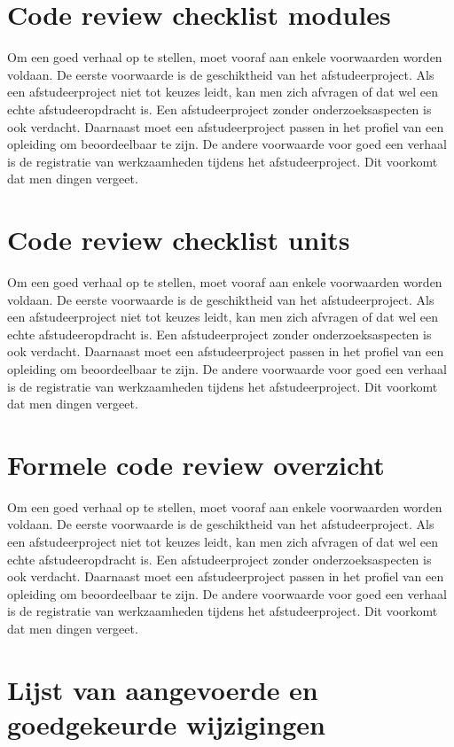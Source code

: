 			\section{Code review checklist modules
			}
			
			Om een goed verhaal op te stellen, moet vooraf aan enkele voorwaarden
			worden voldaan. De eerste voorwaarde is de geschiktheid van het
			afstudeerproject. Als een afstudeerproject niet tot keuzes leidt, kan
			men zich afvragen of dat wel een echte afstudeeropdracht is. Een
			afstudeerproject zonder onderzoeksaspecten is ook verdacht. Daarnaast
			moet een afstudeerproject passen in het profiel van een opleiding om
			beoordeelbaar te zijn. De andere voorwaarde voor goed een verhaal is
			de registratie van werkzaamheden tijdens het afstudeerproject. Dit
			voorkomt dat men dingen vergeet.
			\section{Code review checklist units
			}
			
			Om een goed verhaal op te stellen, moet vooraf aan enkele voorwaarden
			worden voldaan. De eerste voorwaarde is de geschiktheid van het
			afstudeerproject. Als een afstudeerproject niet tot keuzes leidt, kan
			men zich afvragen of dat wel een echte afstudeeropdracht is. Een
			afstudeerproject zonder onderzoeksaspecten is ook verdacht. Daarnaast
			moet een afstudeerproject passen in het profiel van een opleiding om
			beoordeelbaar te zijn. De andere voorwaarde voor goed een verhaal is
			de registratie van werkzaamheden tijdens het afstudeerproject. Dit
			voorkomt dat men dingen vergeet.
			\section{Formele code review overzicht}
			
			Om een goed verhaal op te stellen, moet vooraf aan enkele voorwaarden
			worden voldaan. De eerste voorwaarde is de geschiktheid van het
			afstudeerproject. Als een afstudeerproject niet tot keuzes leidt, kan
			men zich afvragen of dat wel een echte afstudeeropdracht is. Een
			afstudeerproject zonder onderzoeksaspecten is ook verdacht. Daarnaast
			moet een afstudeerproject passen in het profiel van een opleiding om
			beoordeelbaar te zijn. De andere voorwaarde voor goed een verhaal is
			de registratie van werkzaamheden tijdens het afstudeerproject. Dit
			voorkomt dat men dingen vergeet.
			\section{Lijst van aangevoerde en goedgekeurde wijzigingen}
			
